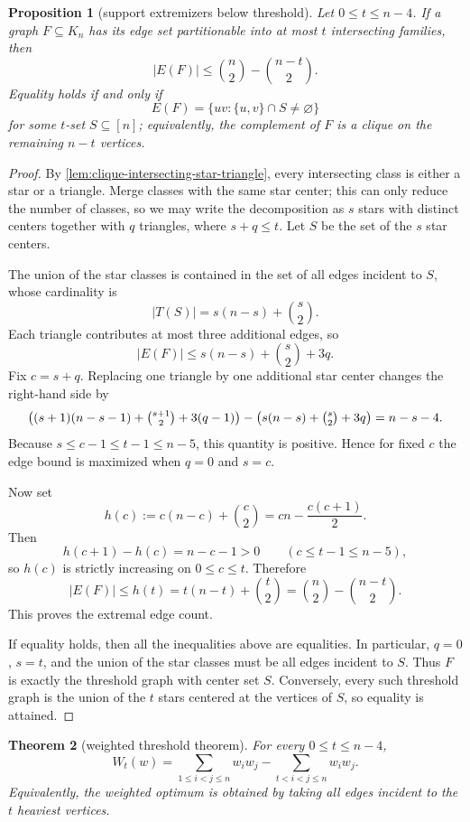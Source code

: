\documentclass[11pt]{article}
\newtheorem{theorem}{Theorem}[section]
\newtheorem{proposition}[theorem]{Proposition}
\theoremstyle{definition}
\begin{document}
\begin{proposition}[support extremizers below threshold]\label{prop:threshold-support}
Let \(0\le t\le n-4\). If a graph \(F\subseteq K_n\) has its edge set partitionable into at most \(t\) intersecting families, then
\[
|E(F)|\le \binom n2-\binom{n-t}{2}.
\]
Equality holds if and only if
\[
E(F)=\{uv:\{u,v\}\cap S\neq\varnothing\}
\]
for some \(t\)-set \(S\subseteq [n]\); equivalently, the complement of \(F\) is a clique on the remaining \(n-t\) vertices.
\end{proposition}

\begin{proof}
By \cref{lem:clique-intersecting-star-triangle}, every intersecting class is either a star or a triangle. Merge classes with the same star center; this can only reduce the number of classes, so we may write the decomposition as \(s\) stars with distinct centers together with \(q\) triangles, where \(s+q\le t\). Let \(S\) be the set of the \(s\) star centers.

The union of the star classes is contained in the set of all edges incident to \(S\), whose cardinality is
\[
|T(S)|=s(n-s)+\binom{s}{2}.
\]
Each triangle contributes at most three additional edges, so
\[
|E(F)|\le s(n-s)+\binom{s}{2}+3q.
\]
Fix \(c=s+q\). Replacing one triangle by one additional star center changes the right-hand side by
\[
\bigl((s+1)(n-s-1)+\tbinom{s+1}{2}+3(q-1)\bigr)-\bigl(s(n-s)+\tbinom{s}{2}+3q\bigr)=n-s-4.
\]
Because \(s\le c-1\le t-1\le n-5\), this quantity is positive. Hence for fixed \(c\) the edge bound is maximized when \(q=0\) and \(s=c\).

Now set
\[
h(c):=c(n-c)+\binom{c}{2}=cn-\frac{c(c+1)}{2}.
\]
Then
\[
h(c+1)-h(c)=n-c-1>0
\qquad(c\le t-1\le n-5),
\]
so \(h(c)\) is strictly increasing on \(0\le c\le t\). Therefore
\[
|E(F)|\le h(t)=t(n-t)+\binom{t}{2}=\binom n2-\binom{n-t}{2}.
\]
This proves the extremal edge count.

If equality holds, then all the inequalities above are equalities. In particular, \(q=0\), \(s=t\), and the union of the star classes must be all edges incident to \(S\). Thus \(F\) is exactly the threshold graph with center set \(S\). Conversely, every such threshold graph is the union of the \(t\) stars centered at the vertices of \(S\), so equality is attained.
\end{proof}

\begin{theorem}[weighted threshold theorem]\label{thm:weighted-threshold}
For every \(0\le t\le n-4\),
\[
W_t(w)=
\sum_{1\le i<j\le n} w_iw_j
-
\sum_{t<i<j\le n} w_iw_j.
\]
Equivalently, the weighted optimum is obtained by taking all edges incident to the \(t\) heaviest vertices.
\end{theorem}
\end{document}
